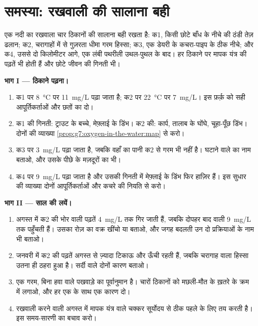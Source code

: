 \section{समस्या: रखवाली की सालाना बही}

\begin{problem}[{सप्ताहांत समस्या --- एक नदी, चार ठिकाने, और साल भर
के माप}]\label{pb:g7:oxygen-in-the-water:1}
एक नदी का रखवाला चार ठिकानों की सालाना बही रखता है: क1, किसी छोटे बाँध
के नीचे की ठंडी तेज़ ढलान; क2, चरागाहों में से गुज़रता धीमा गरम हिस्सा;
क3, एक डेयरी के कचरा-पाइप के ठीक नीचे; और क4, उससे दो किलोमीटर आगे, एक
लंबी पथरीली उथल-पुथल के बाद। हर ठिकाने पर मापक यंत्र की पढ़तें भी होती
हैं और छोटे जीवन की गिनती भी।

\medskip\noindent\textbf{भाग I --- ठिकाने पढ़ना।}
\begin{enumerate}
  \item क1 पर \qty{8}{\degreeCelsius} पर \qty{11}{mg/L} पढ़ा जाता है;
        क2 पर \qty{22}{\degreeCelsius} पर \qty{7}{mg/L}। इस फ़र्क़ को
        सही आपूर्तिकर्ताओं और छतों का  दो।
  \item क1 की गिनती: ट्राउट के बच्चे, मेफ़्लाई के डिंभ। क2 की: कार्प,
        तालाब के घोंघे, चूहा-पूँछ डिंभ। दोनों की व्याख्या
        \cref{prop:g7:oxygen-in-the-water:map} से करो।
  \item क3 पर \qty{3}{mg/L} पढ़ा जाता है, जबकि वहाँ का पानी क2 से गरम
        भी नहीं है। घटाने वाले का नाम बताओ, और उसके पीछे के मज़दूरों
        का भी।
  \item क4 पर \qty{9}{mg/L} पढ़ा जाता है और उसकी गिनती में मेफ़्लाई के
        डिंभ फिर हाज़िर हैं। इस सुधार की व्याख्या दोनों
        आपूर्तिकर्ताओं और कचरे की नियति से करो।
\end{enumerate}

\medskip\noindent\textbf{भाग II --- साल की लयें।}
\begin{enumerate}[resume]
  \item अगस्त में क2 की भोर वाली पढ़तें \qty{4}{mg/L} तक गिर जाती हैं,
        जबकि दोपहर बाद वाली \qty{9}{mg/L} तक पहुँचती हैं। उसका रोज़ का
        वक्र खींचो या बताओ, और जगह बदलती उन दो प्रक्रियाओं के नाम भी
        बताओ।
  \item जनवरी में क2 की पढ़तें अगस्त से ज़्यादा टिकाऊ और ऊँची रहती हैं,
        जबकि चरागाह वाला हिस्सा उतना ही ठहरा हुआ है। सर्दी वाले दोनों
        कारण बताओ।
  \item एक गरम, बिना हवा वाले पखवाड़े का पूर्वानुमान है। चारों ठिकानों
        को मछली-मौत के ख़तरे के क्रम में लगाओ, और हर एक के साथ एक कारण
        दो।
  \item रखवाली करने वाली अगस्त में मापक यंत्र वाले चक्कर सूर्योदय से
        ठीक पहले के लिए तय करती है। इस समय-सारणी का बचाव करो।
\end{enumerate}


\end{problem}
